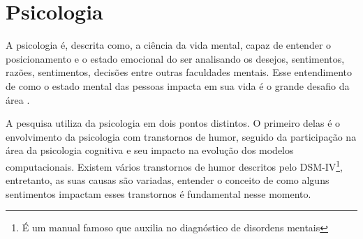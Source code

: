 \section{Psicologia}

A psicologia é, descrita como, a ciência da vida mental, capaz de entender o posicionamento e o estado emocional do ser analisando os desejos, sentimentos, razões, sentimentos, decisões entre outras faculdades mentais. Esse entendimento de como o estado mental das pessoas impacta em sua vida é o grande desafio da área \cite[4-8]{william1890principles}.

A pesquisa utiliza da psicologia em dois pontos distintos. O primeiro delas é o envolvimento da psicologia com transtornos de humor, seguido da participação na área da psicologia cognitiva e seu impacto na evolução dos modelos computacionais. Existem vários transtornos de humor descritos pelo DSM-IV\footnote{É um manual famoso que auxilia no diagnóstico de disordens mentais\cite{dsmiv}}, entretanto, as suas causas são variadas, entender o conceito de como alguns sentimentos impactam esses transtornos é fundamental nesse momento.



